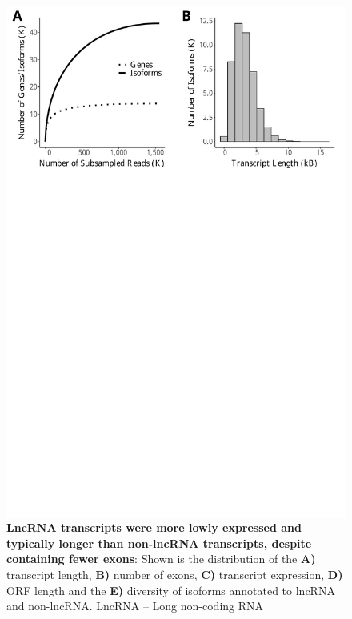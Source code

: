 \begin{figure}[htp]
	\begin{center}
		\includegraphics[page=7,trim={0 1cm 0 0},scale = 0.55]{Figures/IsoSeqWholeTranscriptome.pdf}
	\end{center}
	\captionsetup{width=0.95\textwidth}
	\caption[Characterisation of LncRNA in Whole Transcriptome runs]%
	{\textbf{LncRNA transcripts were more lowly expressed and typically longer than non-lncRNA transcripts, despite containing fewer exons}: Shown is the distribution of the \textbf{A)} transcript length, \textbf{B)} number of exons, \textbf{C)} transcript expression, \textbf{D)} ORF length and the \textbf{E)} diversity of isoforms annotated to lncRNA and non-lncRNA. LncRNA – Long non-coding RNA}
	\label{fig:isoseq_whole_lncRNA}
\end{figure}

